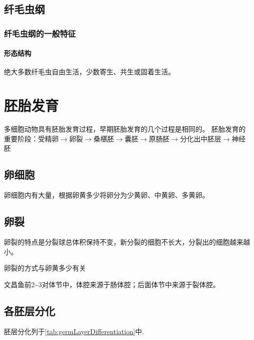 \subsection{纤毛虫纲}

\subsubsection{纤毛虫纲的一般特征}

\paragraph{形态结构}

绝大多数纤毛虫自由生活，少数寄生、共生或固着生活。

\section{胚胎发育}

多细胞动物具有胚胎发育过程，早期胚胎发育的几个过程是相同的。
胚胎发育的重要阶段：受精卵$\longrightarrow$卵裂$\longrightarrow$桑椹胚$\longrightarrow$囊胚$\longrightarrow$原肠胚$\longrightarrow$分化出中胚层$\longrightarrow$神经胚
\subsection{卵细胞}

卵细胞内有大量，根据卵黄多少将卵分为少黄卵、中黄卵、多黄卵。


\subsection{卵裂}

卵裂的特点是分裂球总体积保持不变，新分裂的细胞不长大，分裂出的细胞越来越小。

卵裂的方式与卵黄多少有关



文昌鱼前2\textasciitilde3对体节中，体腔来源于肠体腔；后面体节中来源于裂体腔。


\subsection{各胚层分化}

胚层分化列于\autoref{tab:germLayerDifferentiation}中.

